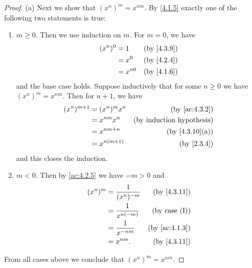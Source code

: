 \begin{proof}{(a)}
  Next we show that \((x^n)^m = x^{nm}\).
  By \cref{4.1.5} exactly one of the following two statements is true:
  \begin{enumerate}[label=(\Roman*)]
    \item \(m \geq 0\).
          Then we use induction on \(m\).
          For \(m = 0\), we have
          \begin{align*}
            (x^n)^0 & = 1      & \text{(by \cref{4.3.9})} \\
                    & = x^0    & \text{(by \cref{4.2.4})} \\
                    & = x^{n0} & \text{(by \cref{4.1.6})}
          \end{align*}
          and the base case holds.
          Suppose inductively that for some \(n \geq 0\) we have \((x^n)^m = x^{nm}\).
          Then for \(n + 1\), we have
          \begin{align*}
            (x^n)^{m + 1} & = (x^n)^m x^n  & \text{(by \cref{ac:4.3.2})}      \\
                          & = x^{nm} x^n   & \text{(by induction hypothesis)} \\
                          & = x^{nm + n}   & \text{(by \cref{4.3.10}(a))}     \\
                          & = x^{n(m + 1)} & \text{(by \cref{2.3.4})}
          \end{align*}
          and this closes the induction.
    \item \(m < 0\).
          Then by \cref{ac:4.2.5} we have \(-m > 0\) and
          \begin{align*}
            (x^n)^m & = \frac{1}{(x^n)^{-m}} & \text{(by \cref{4.3.11})}   \\
                    & = \frac{1}{x^{n(-m)}}  & \text{(by case (I))}        \\
                    & = \frac{1}{x^{-nm}}    & \text{(by \cref{ac:4.1.3})} \\
                    & = x^{nm}.              & \text{(by \cref{4.3.11})}
          \end{align*}
  \end{enumerate}
  From all cases above we conclude that \((x^n)^m = x^{nm}\).


\end{proof}
